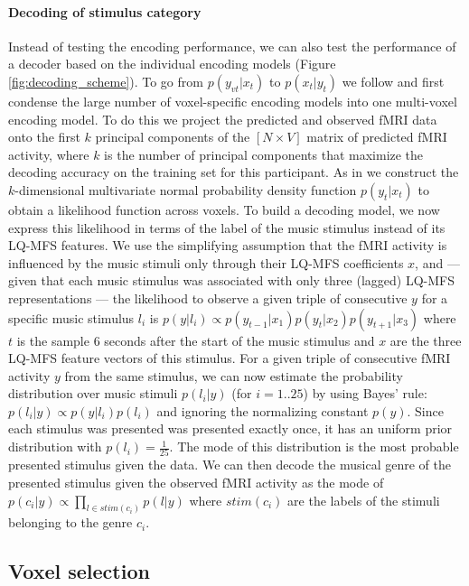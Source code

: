 \paragraph{Decoding of stimulus category}

Instead of testing the encoding performance, we can also test the performance of
a decoder based on the individual encoding models \citet{NG11}
(Figure \ref{fig:decoding_scheme}). To go from
$p(y_{vt}|x_{t})$ to $p(x_{t}|y_{t})$ we follow \citet{NG09} and first condense
the large number of voxel-specific encoding models into one multi-voxel encoding model.
To do this we project the predicted and observed f{MRI} data onto the first $k$
principal components of the $[N\times V]$ matrix of predicted f{MRI} activity, where $k$ is the number of principal components that maximize the decoding
accuracy on the training set for this participant.
As in \citet{NG09} we construct the $k$-dimensional multivariate normal
probability density function $p(y_{t}|x_{t})$ to obtain a likelihood function across voxels.
To build a decoding model, we now express this likelihood in terms of the label
of the music stimulus instead of its LQ-MFS features.
We use the simplifying assumption that the f{MRI} activity is influenced by the music stimuli only through their LQ-MFS
coefficients $x$, and --- given that each music stimulus was associated with only
three (lagged) LQ-MFS representations --- the likelihood to observe a given
triple of consecutive $y$ for a specific music stimulus $l_{i}$ is $p(y|l_{i}) \propto
p(y_{t-1}|x_{1})p(y_{t}|x_{2})p(y_{t+1}|x_{3})$ where $t$ is the sample 6
seconds after the start of the music stimulus and $x$ are the three LQ-MFS
feature vectors of this stimulus.
For a given triple of consecutive f{MRI} activity $y$ from the same stimulus, we can now estimate the probability distribution over music stimuli
$p(l_{i}|y)$ (for $i=1..25$) by using Bayes' rule: $p(l_{i}|y) \propto
p(y|l_{i})p(l_{i})$ and ignoring the normalizing constant $p(y)$. Since each
stimulus was presented was presented exactly once, it has an uniform prior
distribution with $p(l_{i})=\frac{1}{25}$. The mode of this distribution is the
most probable presented stimulus given the data.
We can then decode the musical genre of the presented stimulus given the observed f{MRI} activity as the mode of $p(c_{i}|y)
\propto \prod\nolimits_{l \in stim(c_{i})} p(l|y)$ where $stim(c_{i})$ are
the labels of the stimuli belonging to the genre $c_{i}$. 

\subsection*{Voxel selection}

